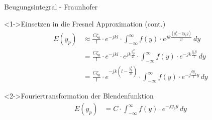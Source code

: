 \begin{frame}{Beugungsintegral - Fraunhofer}
    \begin{block}<1->{Einsetzen in die Fresnel Approximation (cont.)}
        \begin{align*}
            E(y_p)
            &\approx
            \frac{C\zeta_0}{l} \cdot e^{-jkl} \cdot \int_{-\infty}^{\infty}f(y)\cdot e^{jk\frac{(y_p^2 - 2y_py)}{2l}} \,dy
            \\
            &=
            \frac{C\zeta_0}{l} \cdot e^{-jkl} \cdot e^{jk\frac{y_p^2}{2l}} \cdot \int_{-\infty}^{\infty}f(y)\cdot e^{-jk\frac{y_py}{l}} \,dy
            \\
            &=
            \frac{C\zeta_0}{l} \cdot e^{-jk\left(l-\frac{y_p^2}{2l}\right)} \cdot \int_{-\infty}^{\infty}f(y)\cdot e^{-j\frac{ky_p}{l}y} \,dy
        \end{align*}
    \end{block}
    \begin{exampleblock}<2->{Fouriertransformation der Blendenfunktion}
        \begin{align*}
            E(y_p)
            &=
            C \cdot \int_{-\infty}^{\infty}f(y)\cdot e^{-jy_py} \,dy
        \end{align*}
    \end{exampleblock}
\end{frame}
